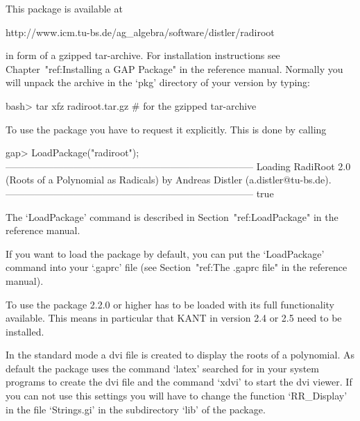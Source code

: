 


This package is available at

\begintt
http://www.icm.tu-bs.de/ag_algebra/software/distler/radiroot
\endtt

in form of a gzipped tar-archive. For installation instructions see
Chapter~"ref:Installing a GAP Package" in the {\GAP} reference manual. 
Normally you will unpack the archive in the `pkg' directory of your
{\GAP} version by typing:

\beginexample
    bash> tar xfz radiroot.tar.gz        # for the gzipped tar-archive
\endexample


To use the {\Radiroot} package you have to request it explicitly. This  is
done by calling

\beginexample
gap> LoadPackage("radiroot");
-----------------------------------------------------------------------------
Loading  RadiRoot 2.0 (Roots of a Polynomial as Radicals)
by Andreas Distler (a.distler@tu-bs.de).
-----------------------------------------------------------------------------
true
\endexample

The `LoadPackage' command is described  in  Section~"ref:LoadPackage"  in
the {\GAP} reference manual.

If you want to load the {\Radiroot} package by default, you  can  put  the
`LoadPackage' command  into  your  `.gaprc'  file  (see  Section~"ref:The
.gaprc file" in the {\GAP} reference manual).


To use {\Radiroot} the package {\Alnuth} 2.2.0 or higher has to be
loaded with its full functionality available. This means in particular
that KANT \cite{KANT} in version 2.4 or 2.5 need to be installed.

In the standard mode a dvi file is created to display the roots of a
polynomial. As default the package uses the command `latex' searched
for in your system programs to create the dvi file and the command
`xdvi' to start the dvi viewer. If you can not use this settings you
will have to change the function `RR_Display' in the file `Strings.gi'
in the subdirectory `lib' of the package.

